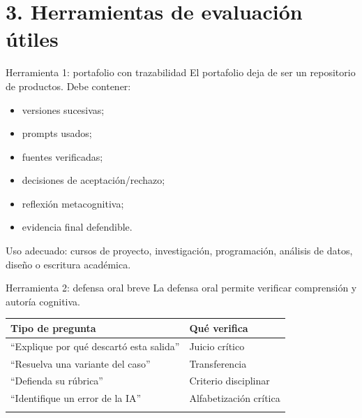 \documentclass[
  ignorenonframetext,
  aspectratio=169,
  spanish,
]{beamer}
\newcounter{none} %
\providecommand{\tightlist}{%
  \setlength{\itemsep}{0pt}\setlength{\parskip}{0pt}}
\begin{document}
\section{3. Herramientas de evaluación
útiles}\label{herramientas-de-evaluaciuxf3n-uxfatiles}

\begin{frame}{Herramienta 1: portafolio con trazabilidad}
\protect{}\label{herramienta-1-portafolio-con-trazabilidad}
El portafolio deja de ser un repositorio de productos. Debe contener:

\begin{itemize}
\tightlist
\item
  versiones sucesivas;
\item
  prompts usados;
\item
  fuentes verificadas;
\item
  decisiones de aceptación/rechazo;
\item
  reflexión metacognitiva;
\item
  evidencia final defendible.
\end{itemize}

Uso adecuado: cursos de proyecto, investigación, programación, análisis
de datos, diseño o escritura académica.
\end{frame}

\begin{frame}{Herramienta 2: defensa oral breve}
\protect{}\label{herramienta-2-defensa-oral-breve}
La defensa oral permite verificar comprensión y autoría cognitiva.

{\def\LTcaptype{none} %
\begin{longtable}[]{@{}ll@{}}
\toprule\noalign{}
Tipo de pregunta & Qué verifica \\
\midrule\noalign{}
\endhead
``Explique por qué descartó esta salida'' & Juicio crítico \\
``Resuelva una variante del caso'' & Transferencia \\
``Defienda su rúbrica'' & Criterio disciplinar \\
``Identifique un error de la IA'' & Alfabetización crítica \\
\bottomrule\noalign{}
\end{longtable}
}
\end{frame}
\end{document}
